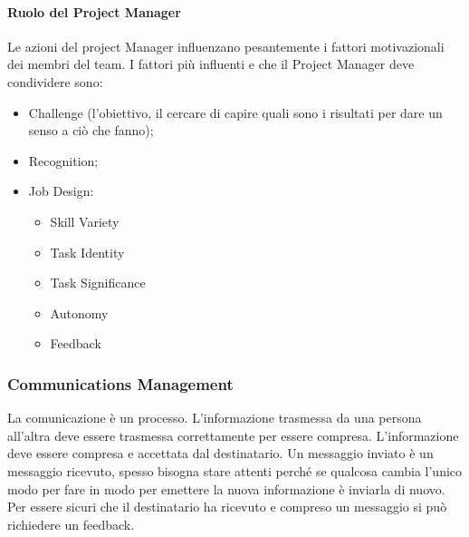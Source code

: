 \paragraph{Ruolo del Project Manager}
Le azioni del project Manager influenzano pesantemente i fattori motivazionali dei membri del team. I fattori più influenti e che il Project Manager deve condividere sono:
\begin{itemize}
	\item Challenge (l'obiettivo, il cercare di capire quali sono i risultati per dare un senso a ciò che fanno);
	\item Recognition;
	\item Job Design: 
	\begin{itemize}
		\item Skill Variety
		\item Task Identity
		\item Task Significance
		\item Autonomy
		\item Feedback
	\end{itemize}
\end{itemize}
\subsubsection{Communications Management}
La comunicazione è un processo. L'informazione trasmessa da una persona all'altra deve essere trasmessa correttamente per essere compresa. L'informazione deve essere compresa e accettata dal destinatario. Un messaggio inviato è un messaggio ricevuto, spesso bisogna stare attenti perché se qualcosa cambia l'unico modo per fare in modo per emettere la nuova informazione è inviarla di nuovo.\newline
Per essere sicuri che il destinatario ha ricevuto e compreso un messaggio si può richiedere un feedback.
